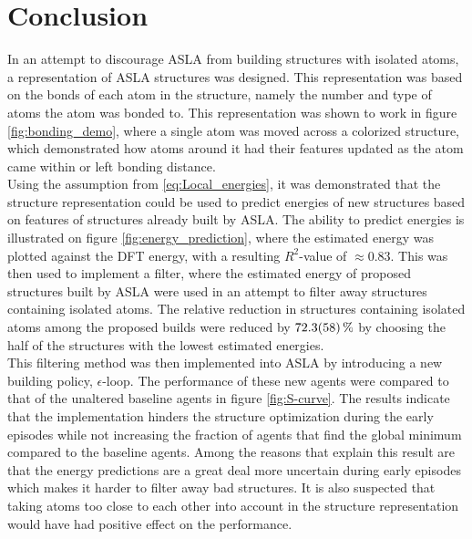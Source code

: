\chapter{Conclusion}

In an attempt to discourage ASLA from building structures with isolated atoms, a representation of ASLA structures was designed. This representation was based on the bonds of each atom in the structure, namely the number and type of atoms the atom was bonded to. This representation was shown to work in figure \ref{fig:bonding_demo}, where a single atom was moved across a colorized structure, which demonstrated how atoms around it had their features updated as the atom came within or left bonding distance. \\

Using the assumption from \eqref{eq:Local_energies}, it was demonstrated that the structure representation could be used to predict energies of new structures based on features of structures already built by ASLA. The ability to predict energies is illustrated on figure \ref{fig:energy_prediction}, where the estimated energy was plotted against the DFT energy, with a resulting $R^2$-value of $\approx 0.83$. This was then used to implement a filter, where the estimated energy of proposed structures built by ASLA were used in an attempt to filter away structures containing isolated atoms. The relative reduction in structures containing isolated atoms among the proposed builds were reduced by $\SI{72.3 \pm 5.8}{\percent}$ by choosing the half of the structures with the lowest estimated energies. \\

This filtering method was then implemented into ASLA by introducing a new building policy, $\epsilon$-loop. The performance of these new agents were compared to that of the unaltered baseline agents in figure \ref{fig:S-curve}. The results indicate that the implementation hinders the structure optimization during the early episodes while not increasing the fraction of agents that find the global minimum compared to the baseline agents. Among the reasons that explain this result are that the energy predictions are a great deal more uncertain during early episodes which makes it harder to filter away bad structures. It is also suspected that taking atoms too close to each other into account in the structure representation would have had positive effect on the performance.